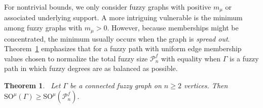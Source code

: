 \documentclass[12pt]{amsart}
\newtheorem{theorem}{Theorem}[section]
\newcommand{\SOG}{\mathrm{SO}^{\mu}}
\newcommand{\PP}{\mathcal{P}}
\begin{document}
For nontrivial bounds, we only consider fuzzy graphs with positive $m_{\mu}$ or associated underlying support. 
A more intriguing vulnerable is the minimum among fuzzy graphs with $m_{\mu} > 0$. However, because memberships might be concentrated, the minimum usually occurs when the graph is \textit{spread out}. 
Theorem~\ref{MainThmSom2} emphasizes that for  a fuzzy path with uniform edge membership values chosen to normalize the total fuzzy size  $\PP_n^f$  with equality when $\Gamma$ is a fuzzy path in which fuzzy degrees are as balanced as possible.


\begin{theorem}~\label{MainThmSom2}
Let $\Gamma$ be a connected fuzzy graph on $n \geq 2$ vertices. Then $\SOG(\Gamma) \geqslant \SOG(\PP_n^f).$
\end{theorem}
\end{document}
